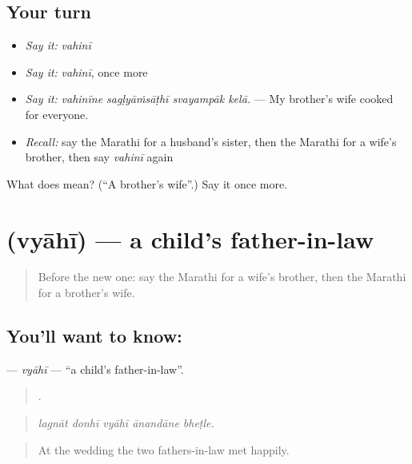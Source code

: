 \subsection*{Your turn}
\begin{itemize}
\raggedright
  \item \emph{Say it:} \emph{vahinī}
  \item \emph{Say it:} \emph{vahinī}, once more
  \item \emph{Say it:} \emph{vahinīne sagḷyāṁsāṭhī svayampāk kelā.} — My brother's wife cooked for everyone.
  \item \emph{Recall:} say the Marathi for a husband's sister, then the Marathi for a wife's brother, then say \emph{vahinī} again
\end{itemize}

\begin{tcolorbox}[breakable,colback=teal!4,colframe=teal!35!black,title={Before you move on}]
What does  mean? (\textquotedblleft{}A brother's wife\textquotedblright{}.) Say it once more.
\end{tcolorbox}
\section[\texorpdfstring{\mr{व्याही} (vyāhī)}{व्याही (vyāhī)}]{ (vyāhī) — a child's father-in-law}

\label{lesson:MR-C496-vyahi}



\begin{quote}
Before the new one: say the Marathi for a wife's brother, then the Marathi for a brother's wife.
\end{quote}

\subsection*{You'll want to know: }
\textbf{} — \emph{vyāhī} — \textquotedblleft{}a child's father-in-law\textquotedblright{}.

\begin{quote}
    .
\end{quote}

\begin{quote}
\emph{lagnāt donhī vyāhī ānandāne bheṭle.}
\end{quote}

\begin{quote}
At the wedding the two fathers-in-law met happily.
\end{quote}

